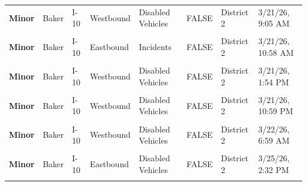 \documentclass[
]{article}
\begin{document}
\begin{longtable}[t]{>{\raggedright\arraybackslash}p{1.5cm}>{\raggedright\arraybackslash}p{2.5cm}>{\raggedright\arraybackslash}p{3cm}>{\raggedright\arraybackslash}p{1.8cm}>{\raggedright\arraybackslash}p{2.5cm}lll}
\textbf{Minor} & Baker & I-10 & Westbound & Disabled Vehicles & FALSE & District 2 & 3/21/26, 9:05 AM\\
\addlinespace
\textbf{\cellcolor{gray!10}{Minor}} & \cellcolor{gray!10}{Baker} & \cellcolor{gray!10}{I-10} & \cellcolor{gray!10}{Westbound} & \cellcolor{gray!10}{Disabled Vehicles} & \cellcolor{gray!10}{FALSE} & \cellcolor{gray!10}{District 2} & \cellcolor{gray!10}{3/21/26, 10:01 AM}\\
\textbf{Minor} & Baker & I-10 & Eastbound & Incidents & FALSE & District 2 & 3/21/26, 10:58 AM\\
\textbf{\cellcolor{gray!10}{Minor}} & \cellcolor{gray!10}{Baker} & \cellcolor{gray!10}{I-10} & \cellcolor{gray!10}{Westbound} & \cellcolor{gray!10}{Disabled Vehicles} & \cellcolor{gray!10}{FALSE} & \cellcolor{gray!10}{District 2} & \cellcolor{gray!10}{3/21/26, 12:56 PM}\\
\textbf{Minor} & Baker & I-10 & Westbound & Disabled Vehicles & FALSE & District 2 & 3/21/26, 1:54 PM\\
\textbf{\cellcolor{gray!10}{Minor}} & \cellcolor{gray!10}{Baker} & \cellcolor{gray!10}{I-10} & \cellcolor{gray!10}{Westbound} & \cellcolor{gray!10}{Disabled Vehicles} & \cellcolor{gray!10}{FALSE} & \cellcolor{gray!10}{District 2} & \cellcolor{gray!10}{3/21/26, 8:21 PM}\\
\addlinespace
\textbf{Minor} & Baker & I-10 & Westbound & Disabled Vehicles & FALSE & District 2 & 3/21/26, 10:59 PM\\
\textbf{\cellcolor{gray!10}{Minor}} & \cellcolor{gray!10}{Baker} & \cellcolor{gray!10}{I-10} & \cellcolor{gray!10}{Westbound} & \cellcolor{gray!10}{Incidents} & \cellcolor{gray!10}{FALSE} & \cellcolor{gray!10}{District 2} & \cellcolor{gray!10}{3/22/26, 2:33 AM}\\
\textbf{Minor} & Baker & I-10 & Westbound & Disabled Vehicles & FALSE & District 2 & 3/22/26, 6:59 AM\\
\textbf{\cellcolor{gray!10}{Minor}} & \cellcolor{gray!10}{Baker} & \cellcolor{gray!10}{I-10} & \cellcolor{gray!10}{Westbound} & \cellcolor{gray!10}{Disabled Vehicles} & \cellcolor{gray!10}{FALSE} & \cellcolor{gray!10}{District 2} & \cellcolor{gray!10}{3/23/26, 7:57 AM}\\
\textbf{Minor} & Baker & I-10 & Eastbound & Disabled Vehicles & FALSE & District 2 & 3/25/26, 2:32 PM\\
\addlinespace
\textbf{\cellcolor{gray!10}{Minor}} & \cellcolor{gray!10}{Baker} & \cellcolor{gray!10}{I-10} & \cellcolor{gray!10}{Eastbound} & \cellcolor{gray!10}{Disabled Vehicles} & \cellcolor{gray!10}{FALSE} & \cellcolor{gray!10}{District 2} & \cellcolor{gray!10}{3/27/26, 11:38 PM}\\

\end{longtable}
\end{document}
